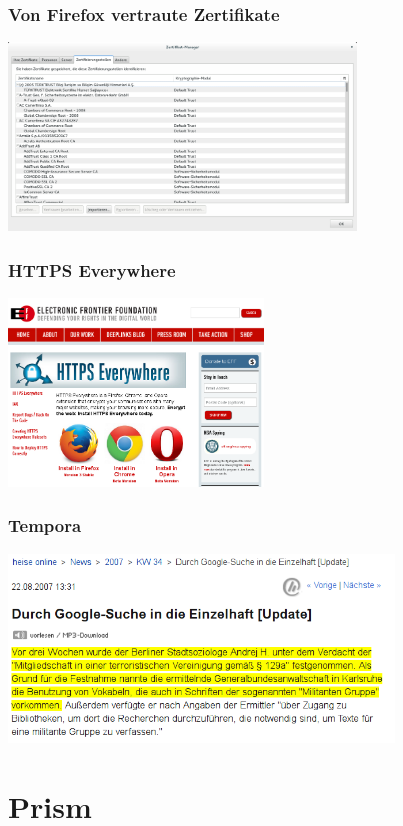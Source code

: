 \documentclass[12pt]{beamer}
\begin{document}
\begin{frame}
    \frametitle{Von Firefox vertraute Zertifikate}
    \begin{center}
      \includegraphics[height=5cm]{img/zertifikate.png}
    \end{center}
\end{frame}

\begin{frame}
  \frametitle{HTTPS Everywhere}
    \begin{center}
      \includegraphics[height=5cm]{img/https-everywhere.png}
    \end{center}
\end{frame}

\begin{frame}
  \frametitle{Tempora}
    \begin{center}
      \includegraphics[height=5cm]{img/andrej-h.png}
    \end{center}
\end{frame}

\section{Prism}
\end{document}
